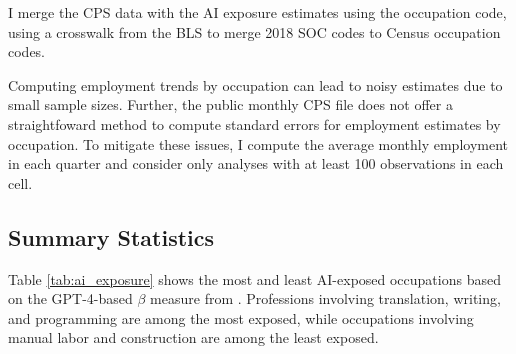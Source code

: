 \documentclass[12pt]{article}
\numberwithin{equation}{section}
\theoremstyle{theorem}\newcustomtheorem{theorem}{{\bf\sc Theorem}}
\theoremstyle{definition}\newcustomtheorem{assumption}{{\bf\sc Assumption}}
\theoremstyle{theorem} \newcustomtheorem{proposition}{{\bf\sc Proposition}}
\begin{document}
I merge the CPS data with the AI exposure estimates using the occupation code, using a crosswalk from the BLS to merge 2018 SOC codes to Census occupation codes. 

Computing employment trends by occupation can lead to noisy estimates due to small sample sizes. Further, the public monthly CPS file does not offer a straightfoward method to compute standard errors for employment estimates by occupation. To mitigate these issues, I compute the average monthly employment in each quarter and consider only analyses with at least 100 observations in each cell. 

\subsection{Summary Statistics}

Table \ref{tab:ai_exposure} shows the most and least AI-exposed occupations based on the GPT-4-based $\beta$ measure from \citet{eloundou_gpts_2023}. Professions involving translation, writing, and programming are among the most exposed, while occupations involving manual labor and construction are among the least exposed. 
\end{document}
